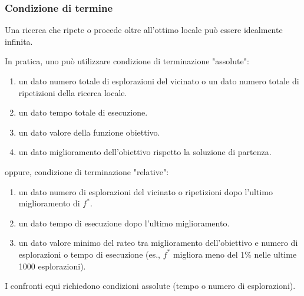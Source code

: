 \documentclass{article}
\begin{document}
\subsubsection{Condizione di termine}
Una ricerca che ripete o procede oltre all'ottimo locale può essere idealmente infinita.

In pratica, uno può utilizzare condizione di terminazione "assolute":
\begin{enumerate}
    \item un dato numero totale di esplorazioni del vicinato o un dato numero totale di
    ripetizioni della ricerca locale.
    \item un dato tempo totale di esecuzione.
    \item un dato valore della funzione obiettivo.
    \item un dato miglioramento dell'obiettivo rispetto la soluzione di partenza.
\end{enumerate}
oppure, condizione di terminazione "relative":
\begin{enumerate}
    \item un dato numero di esplorazioni del vicinato o ripetizioni dopo l'ultimo miglioramento
    di $f^*$.
    \item un dato tempo di esecuzione dopo l'ultimo miglioramento.
    \item un dato valore minimo del rateo tra miglioramento dell'obiettivo e numero di
    esplorazioni o tempo di esecuzione (es., $f^*$ migliora meno del 1\% nelle ultime 1000 esplorazioni).
\end{enumerate}
I confronti equi richiedono condizioni assolute (tempo o numero di esplorazioni).
\end{document}
